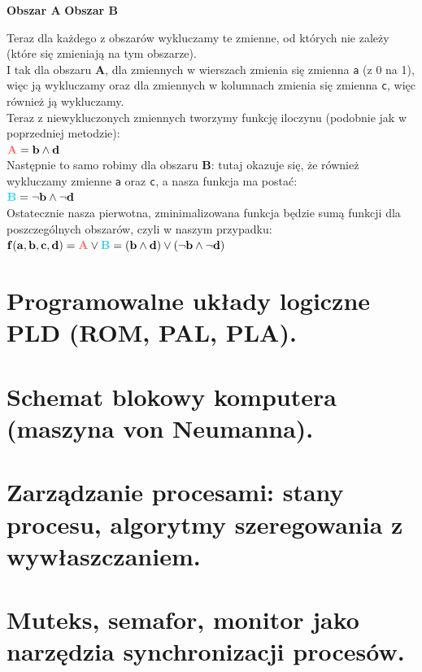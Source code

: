 \documentclass[12pt]{article}
\begin{document}
	\begin{center}
		\textbf{\color[HTML]{FD6864}Obszar A}	\textbf{\color[HTML]{34CDF9}Obszar B}
	\end{center}

	\noindent Teraz dla każdego z obszarów wykluczamy te zmienne, od których nie zależy (które się zmieniają na tym obszarze). \\
	\noindent I tak dla obszaru \textbf{\color[HTML]{FD6864}A}, dla zmiennych w wierszach zmienia się zmienna \texttt{a} (z 0 na 1), więc ją wykluczamy
	oraz dla zmiennych w kolumnach zmienia się zmienna \texttt{c}, więc również ją wykluczamy. \\
	\noindent Teraz z niewykluczonych zmiennych tworzymy funkcję iloczynu (podobnie jak w poprzedniej metodzie): \\
	$\mathbf{{\color[HTML]{FD6864}A} = b \wedge d}$ \\

	\noindent Następnie to samo robimy dla obszaru \textbf{\color[HTML]{34CDF9}B}: tutaj okazuje się, że również wykluczamy zmienne \texttt{a} oraz \texttt{c}, a nasza funkcja ma postać: \\
	$\mathbf{{\color[HTML]{34CDF9}B} = \neg b \wedge \neg d}$ \\

	\noindent Ostatecznie nasza pierwotna, zminimalizowana funkcja będzie sumą funkcji dla poszczególnych obszarów, czyli w naszym przypadku: \\
	$\mathbf{f(a, b, c, d) = {\color[HTML]{FD6864}A} \vee {\color[HTML]{34CDF9}B} = (b \wedge d) \vee (\neg b \wedge \neg d)}$

	\newpage

    \section{Programowalne układy logiczne PLD (ROM, PAL, PLA).}
    \section{Schemat blokowy komputera (maszyna von Neumanna).}
    \section{Zarządzanie procesami: stany procesu, algorytmy szeregowania z wywłaszczaniem.}
    \section{Muteks, semafor, monitor jako narzędzia synchronizacji procesów.}
\end{document}
